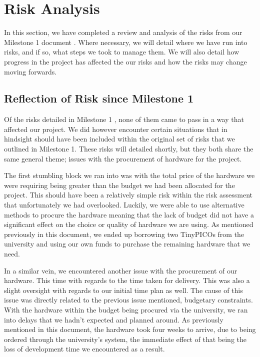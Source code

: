\chapter{Risk Analysis} \label{sec:risk}

In this section, we have completed a review and analysis of the risks from our Milestone 1 document \cite{coaker}. Where necessary, we will detail where we have run into risks, and if so, what steps we took to manage them. We will also detail how progress in the project has affected the our risks and how the risks may change moving forwards.

\section{Reflection of Risk since Milestone 1}
Of the risks detailed in Milestone 1 \cite{coaker}, none of them came to pass in a way that affected our project. We did however encounter certain situations that in hindsight should have been included within the original set of risks that we outlined in Milestone 1. These risks will detailed shortly, but they both share the same general theme; issues with the procurement of hardware for the project. 

The first stumbling block we ran into was with the total price of the hardware we were requiring being greater than the budget we had been allocated for the project. This should have been a relatively simple risk within the risk assessment that unfortunately we had overlooked. Luckily, we were able to use alternative methods to procure the hardware meaning that the lack of budget did not have a significant effect on the choice or quality of hardware we are using. As mentioned previously in this document, we ended up borrowing two TinyPICOs from the university and using our own funds to purchase the remaining hardware that we need. 

In a similar vein, we encountered another issue with the procurement of our hardware. This time with regards to the time taken for delivery. This was also a slight oversight with regards to our initial time plan as well. The cause of this issue was directly related to the previous issue mentioned, budgetary constraints. With the hardware within the budget being procured via the university, we ran into delays that we hadn't expected and planned around. As previously mentioned in this document, the hardware took four weeks to arrive, due to being ordered through the university's system, the immediate effect of that being the loss of development time we encountered as a result. 

